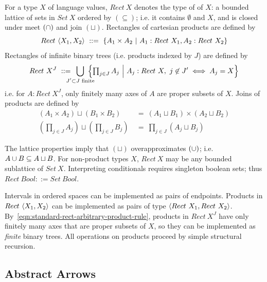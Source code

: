 \documentclass{llncs}
\newcommand{\join}{\sqcup}
\begin{document}
\begin{definition}
\label{def:standard-rectangle}
For a type $X$ of language values, $Rect~X$ denotes the type of  of $X$: a bounded lattice of sets in $Set~X$ ordered by $(\subseteq)$; i.e. it contains $\emptyset$ and $X$, and is closed under meet $(\cap)$ and join $(\join)$.
Rectangles of cartesian products are defined by
\begin{equation}
	Rect~\langle{X_1,X_2}\rangle \ ::= \ \lbrace {A_1 \times A_2} \ \lvert\ {A_1 : Rect~X_1, A_2 : Rect~X_2} \rbrace
\label{eqn:standard-rect-finite-product-rule}
\end{equation}
Rectangles of infinite binary trees (i.e. products indexed by $J$) are defined by
\begin{equation}
	Rect~X^J \ ::= \ \,\displaystyle\bigcup_{\mathclap{J' \subset J \text{ finite}}}\ 
		\left\{\textstyle\prod_{j \in J} A_j\ \middle| \ A_j : Rect~X,\ j \not\in J' \iff A_j = X \right\}
\label{eqn:standard-rect-arbitrary-product-rule}
\end{equation}
i.e. for $A : Rect~X^J$, only finitely many axes of $A$ are proper subsets of $X$.
Joins of products are defined by
\begin{align}
	(A_1 \times A_2) \join (B_1 \times B_2) &\ = \ (A_1 \join B_1) \times (A_2 \join B_2) \\
	(\textstyle\prod_{j \in J} A_j) \join (\textstyle\prod_{j \in J} B_j) &\ = \ \textstyle\prod_{j \in J} (A_j \join B_j)
\end{align}
\end{definition}

The lattice properties imply that $(\join)$ overapproximates $(\cup)$; i.e. $A \u B \subseteq A \join B$.
For non-product types $X$, $Rect~X$ may be any bounded sublattice of $Set~X$.
Interpreting conditionals requires singleton boolean sets; thus $Rect~Bool ::= Set~Bool$.

Intervals in ordered spaces can be implemented as pairs of endpoints.
Products in $Rect~\langle{X_1,X_2}\rangle$ can be implemented as pairs of type $\langle{Rect~X_1,Rect~X_2}\rangle$.
By~\eqref{eqn:standard-rect-arbitrary-product-rule}, products in $Rect~X^J$ have only finitely many axes that are proper subsets of $X$, so they can be implemented as \emph{finite} binary trees.
All operations on products proceed by simple structural recursion.

\subsection{Abstract Arrows}
\end{document}
